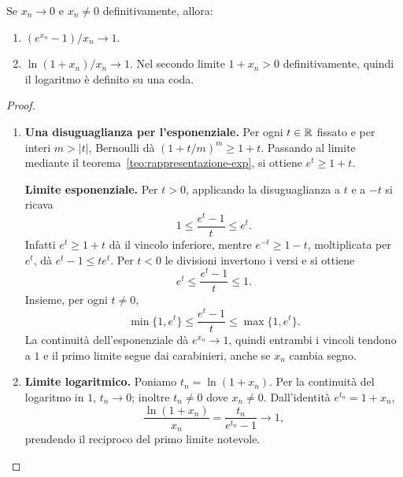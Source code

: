 \begin{teorema}
Se $x_n\to0$ e $x_n\ne0$ definitivamente, allora:
\begin{enumerate}[label=\arabic*.]
\item $(e^{x_n}-1)/x_n\to1$.
\item $\ln(1+x_n)/x_n\to1$. Nel secondo limite $1+x_n>0$ definitivamente, quindi il logaritmo è definito su una coda.
\end{enumerate}
\end{teorema}
\begin{proof}
\begin{enumerate}[label=\arabic*.]
\item \textbf{Una disuguaglianza per l'esponenziale.} Per ogni $t\in\mathbb{R}$ fissato e per interi $m>|t|$, Bernoulli dà $(1+t/m)^m\ge1+t$. Passando al limite mediante il teorema~\ref{teo:rappresentazione-exp}, si ottiene $e^t\ge1+t$.

\textbf{Limite esponenziale.} Per $t>0$, applicando la disuguaglianza a $t$ e a $-t$ si ricava
\[
1\le\frac{e^t-1}{t}\le e^t.
\]
Infatti $e^t\ge1+t$ dà il vincolo inferiore, mentre $e^{-t}\ge1-t$, moltiplicata per $e^t$, dà $e^t-1\le t e^t$. Per $t<0$ le divisioni invertono i versi e si ottiene
\[
e^t\le\frac{e^t-1}{t}\le1.
\]
Insieme, per ogni $t\ne0$,
\[
\min\{1,e^t\}\le\frac{e^t-1}{t}\le\max\{1,e^t\}.
\]
La continuità dell'esponenziale dà $e^{x_n}\to1$, quindi entrambi i vincoli tendono a $1$ e il primo limite segue dai carabinieri, anche se $x_n$ cambia segno.
\item \textbf{Limite logaritmico.} Poniamo $t_n=\ln(1+x_n)$. Per la continuità del logaritmo in $1$, $t_n\to0$; inoltre $t_n\ne0$ dove $x_n\ne0$. Dall'identità $e^{t_n}=1+x_n$,
\[
\frac{\ln(1+x_n)}{x_n}
=\frac{t_n}{e^{t_n}-1}
\longrightarrow1,
\]
prendendo il reciproco del primo limite notevole.
\end{enumerate}
\end{proof}
